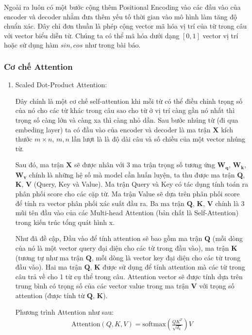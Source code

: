 Ngoài ra luôn có một bước cộng thêm Positional Encoding vào các đầu vào của encoder và decoder nhằm đưa thêm yếu tố thời gian vào mô hình làm tăng độ chuẩn xác. Đây chỉ đơn thuần là phép cộng vector mã hóa vị trí của từ trong câu với vector biểu diễn từ. Chúng ta có thể mã hóa dưới dạng $[0, 1]$ vector vị trí hoặc sử dụng hàm $sin,cos$ như trong bài báo.

\subsubsection{Cơ chế Attention}
\begin{enumerate}[label=\textbf{\arabic*}]
    \item Scaled Dot-Product Attention:

          Đây chính là một cơ chế self-attention khi mỗi từ có thể điều chỉnh trọng số của nó cho các từ khác trong câu sao cho từ ở vị trí càng gần nó nhất thì trọng số càng lớn và càng xa thì càng nhỏ dần. Sau bước nhúng từ (đi qua embeding layer) ta có đầu vào của encoder và decoder là ma trận $\mathbf{X}$ kích thước $m\times n$, $m,n$ lần lượt là là độ dài câu và số chiều của một vector nhúng từ.

          Sau đó, ma trận $\mathbf{X}$ sẽ được nhân với 3 ma trận trọng số tương ứng $\mathbf{W}_\mathbf{q}$, $\mathbf{W}_\mathbf{k}$, $\mathbf{W}_\mathbf{v}$ chính là những hệ số mà model cần huấn luyện, ta thu được ma trận $\mathbf{Q}$, $\mathbf{K}$, $\mathbf{V}$ (Query, Key và Value). Ma trận Query và Key có tác dụng tính toán ra phân phối score cho các cặp từ. Ma trận Value sẽ dựa trên phân phối score để tính ra vector phân phối xác suất đầu ra. Ba ma trận $\mathbf{Q}$, $\mathbf{K}$, $\mathbf{V}$ chính là 3 mũi tên đầu vào của các Multi-head Attention (bản chất là Self-Attention) trong kiến trúc tổng quát hình x.

          Như đã đề cập, Đầu vào để tính attention sẽ bao gồm ma trận $\mathbf{Q}$ (mỗi dòng của nó là một vector query đại diện cho các từ trong đầu vào), ma trận $\mathbf{K}$ (tương tự như ma trận $\mathbf{Q}$, mỗi dòng là vector key đại diện cho các từ trong đầu vào). Hai ma trận $\mathbf{Q}$, $\mathbf{K}$ được sử dụng để tính attention mà các từ trong câu trả về cho 1 từ cụ thể trong câu. Attention vector sẽ được tính dựa trên trung bình có trọng số của các vector value trong ma trận $\mathbf{V}$ với trọng số attention (được tính từ $\mathbf{Q}$, $\mathbf{K}$).

          Phương trình Attention như sau:
          \begin{align}
              \mathrm{Attention}(Q, K, V) = \mathrm{softmax}\left(\frac{QK^T}{\sqrt{d_k}}\right)V
          \end{align}


\end{enumerate}
